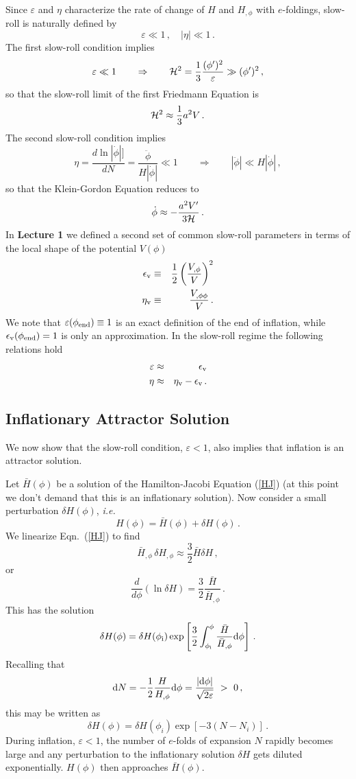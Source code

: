 \documentclass[12pt,letterpaper,rotate]{article}
\def\beq{\begin{equation}}
\def\eeq{\end{equation}}
\def\d{{\rm d}}
\begin{document}
{Since $\varepsilon$ and $\eta$ characterize the rate of change of $H$ and $H_{,\phi}$ with $e$-foldings, slow-roll is naturally defined by
\begin{equation}
\varepsilon \ll 1\, , \quad 
|\eta| \ll 1 \, .
\end{equation}
The first slow-roll condition implies
\beq
\varepsilon \ll 1 \qquad \Rightarrow \qquad {\cal H}^2 = \frac{1}{3} \frac{(\phi')^2}{\varepsilon} \gg (\phi')^2\, ,
\eeq
so that the slow-roll limit of the first Friedmann Equation is
\beq
{\cal H}^2 \approx \frac{1}{3} a^2 V \, .
\eeq
The second slow-roll condition implies
\beq
\eta = \frac{d \ln |\dot\phi|]}{d N} = \frac{\ddot \phi}{H |\dot \phi|}  \ll 1 \quad \quad \Rightarrow \quad \quad |\ddot \phi | \ll H |\dot \phi |\, ,
\eeq
so that the Klein-Gordon Equation reduces to
\beq
\dot{\phi} \approx - \frac{a^2 V'}{3 {\cal H}}\, .
\eeq
In {\bf Lecture 1} we defined
a second set of common slow-roll parameters in terms of the local shape of the potential $V(\phi)$
\begin{eqnarray}
\epsilon_{\rm v} &\equiv& \frac{1}{2} \left(\frac{V_{,\phi}}{V}\right)^2\\
\eta_{\rm v} &\equiv& \frac{V_{,\phi \phi}}{V}\, .
\end{eqnarray}
We note that $\varepsilon(\phi_{\rm end}) \equiv 1$ is an exact definition of the end of inflation, while $\epsilon_{\rm v}(\phi_{\rm end}) =1$ is only an approximation. 
In the slow-roll regime the following relations hold
\begin{eqnarray}
\varepsilon &\approx& \epsilon_{\rm v} \\
\eta &\approx& \eta_{\rm v} - \epsilon_{\rm v}\, .
\end{eqnarray}

\subsection{Inflationary Attractor Solution}

We now show that the slow-roll condition, $\varepsilon < 1$, also implies that inflation is an attractor solution.

Let $\bar H(\phi)$ be a solution of the Hamilton-Jacobi Equation (\ref{HJ}) (at this point we don't demand that this is an inflationary solution).
Now consider a small perturbation $\delta H(\phi)$, {\it i.e.}
\beq
H(\phi) = \bar H(\phi) + \delta H(\phi)\, .
\eeq
We linearize Eqn.~(\ref{HJ}) to find
\beq
\bar H_{, \phi}\, \delta H_{,\phi} \approx \frac{3}{2} \bar H \delta H\, ,
\eeq
or 
\beq
\frac{d}{d \phi} (\ln \delta H) = \frac{3}{2} \frac{\bar H}{\bar H_{, \phi}}\, .
\eeq
This has the solution
\beq
\delta H(\phi) = \delta H(\phi_{\rm i}) \exp \left[ \frac{3}{2} \int_{\phi_{\rm i}}^\phi  \frac{\bar H}{\bar H_{, \phi}} \d \phi \right]\, .
\eeq
Recalling that
\beq
\d N = - \frac{1}{2} \frac{H}{H_{, \phi}} \d \phi = \frac{| \d \phi|}{\sqrt{2 \varepsilon}} \ >\ 0\, ,
\eeq
this may be written as
\beq
\delta H(\phi) = \delta H(\phi_i) \exp \left[ -3 (N-N_i) \right]\, .
\eeq
During inflation, $\varepsilon < 1$, the number of $e$-folds of expansion $N$ rapidly becomes large and any perturbation to the inflationary solution $\delta H$ gets diluted exponentially.
$H(\phi)$ then approaches $\bar H(\phi)$.

}
\end{document}
